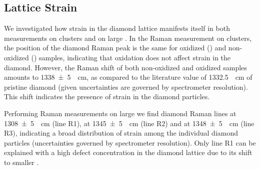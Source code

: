 			\subsection{Lattice Strain}\label{subsec::raman_strain}

				We investigated how strain in the diamond lattice manifests itself in both measurements on \nd clusters and on large \nds.
				In the Raman measurement on \nd clusters, the position of the diamond Raman peak is the same for oxidized (\insituSo) and non-oxidized (\insituSn) samples, indicating that oxidation does not affect strain in the diamond.
				However, the Raman shift of both non-oxidized and oxidized samples amounts to \SI[separate-uncertainty]{1338+-5}{\per\centi\meter}, as compared to the literature value of \SI{1332.5}{\per\centi\meter} of pristine diamond \cite{Zaitsev2001} (given uncertainties are governed by spectrometer resolution).
				This shift indicates the presence of strain in the diamond particles.
				
				Performing Raman measurements on large \nds we find diamond Raman lines at \SI[separate-uncertainty]{1308+-5}{\per\centi\meter} (line R1), at \SI[separate-uncertainty]{1345+-5}{\per\centi\meter} (line R2) and at \SI[separate-uncertainty]{1348+-5}{\per\centi\meter} (line R3), indicating a broad distribution of strain among the individual diamond particles (uncertainties governed by spectrometer resolution).
				Only line R1 can be explained with a high defect concentration in the diamond lattice due to its shift to smaller \wl.
				
